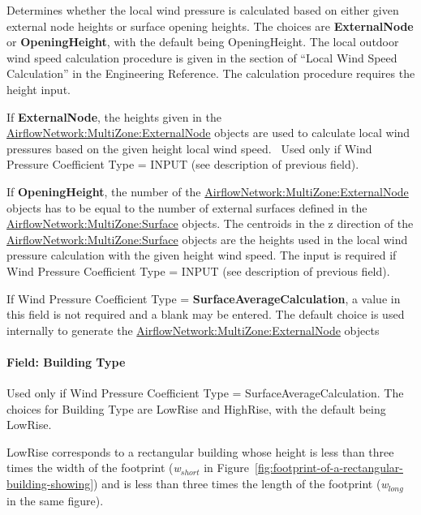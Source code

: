 Determines whether the local wind pressure is calculated based on either given external node heights or surface opening heights. The choices are \textbf{ExternalNode} or \textbf{OpeningHeight}, with the default being OpeningHeight. The local outdoor wind speed calculation procedure is given in the section of ``Local Wind Speed Calculation'' in the Engineering Reference. The calculation procedure requires the height input.

If \textbf{ExternalNode}, the heights given in the \hyperref[airflownetworkmultizoneexternalnode]{AirflowNetwork:MultiZone:ExternalNode} objects are used to calculate local wind pressures based on the given height local wind speed.~ Used only if Wind Pressure Coefficient Type = INPUT (see description of previous field).

If \textbf{OpeningHeight}, the number of the \hyperref[airflownetworkmultizoneexternalnode]{AirflowNetwork:MultiZone:ExternalNode} objects has to be equal to the number of external surfaces defined in the \hyperref[airflownetworkmultizonesurface]{AirflowNetwork:MultiZone:Surface} objects. The centroids in the z direction of the \hyperref[airflownetworkmultizonesurface]{AirflowNetwork:MultiZone:Surface} objects are the heights used in the local wind pressure calculation with the given height wind speed. The input is required if Wind Pressure Coefficient Type = INPUT (see description of previous field).

If Wind Pressure Coefficient Type = \textbf{SurfaceAverageCalculation}, a value in this field is not required and a blank may be entered. The default choice is used internally to generate the \hyperref[airflownetworkmultizoneexternalnode]{AirflowNetwork:MultiZone:ExternalNode} objects

\paragraph{Field: Building Type}\label{field-building-type}

Used only if Wind Pressure Coefficient Type = SurfaceAverageCalculation. The choices for Building Type are LowRise and HighRise, with the default being LowRise.

LowRise corresponds to a rectangular building whose height is less than three times the width of the footprint (\emph{w\(_{short}\)} in Figure~\ref{fig:footprint-of-a-rectangular-building-showing}) and is less than three times the length of the footprint (\emph{w\(_{long}\)} in the same figure).

